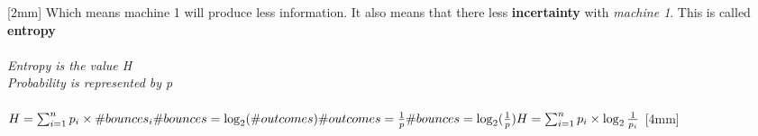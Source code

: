 \documentclass{article}
\begin{document}
    [2mm]
    Which means machine 1 will produce less information. It also means
    that there less \textbf{incertainty} with \textit{machine 1}. This is called \textbf{entropy}
    \\
    [4mm]
    \\
    \textit{Entropy is the value H}\\
    \textit{Probability is represented by p}
    \\
    [2mm]
    \\
    \begin{math}
      H=\sum_{i=1}^np_i\times\#bounces_i\\
      [4mm]
      \#bounces=\log_2(\#outcomes)\\
      \#outcomes=\frac{1}{p}\\
      \#bounces = \log_2(\frac{1}{p})\\
      [4mm]
      H=\sum_{i=1}^np_i\times\log_2\frac{1}{p_i}\\
    \end{math}
    [4mm]
\end{document}
